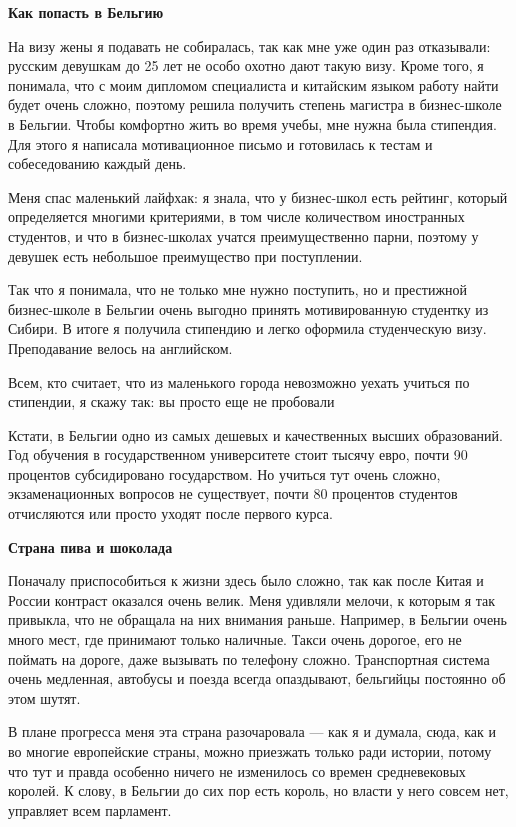 \textbf{Как попасть в Бельгию}

На визу жены я подавать не собиралась, так как мне уже один раз отказывали: русским девушкам до 25 лет не особо охотно дают такую визу. Кроме того, я понимала, что с моим дипломом специалиста и китайским языком работу найти будет очень сложно, поэтому решила получить степень магистра в бизнес-школе в Бельгии. Чтобы комфортно жить во время учебы, мне нужна была стипендия. Для этого я написала мотивационное письмо и готовилась к тестам и собеседованию каждый день.

Меня спас маленький лайфхак: я знала, что у бизнес-школ есть рейтинг, который определяется многими критериями, в том числе количеством иностранных студентов, и что в бизнес-школах учатся преимущественно парни, поэтому у девушек есть небольшое преимущество при поступлении.

Так что я понимала, что не только мне нужно поступить, но и престижной бизнес-школе в Бельгии очень выгодно принять мотивированную студентку из Сибири. В итоге я получила стипендию и легко оформила студенческую визу. Преподавание велось на английском.

\begin{fancyquotes}
    Всем, кто считает, что из маленького города невозможно уехать учиться по стипендии, я скажу так: вы просто еще не пробовали
\end{fancyquotes}

Кстати, в Бельгии одно из самых дешевых и качественных высших образований. Год обучения в государственном университете стоит тысячу евро, почти 90 процентов субсидировано государством. Но учиться тут очень сложно, экзаменационных вопросов не существует, почти 80 процентов студентов отчисляются или просто уходят после первого курса.

\textbf{Страна пива и шоколада}

Поначалу приспособиться к жизни здесь было сложно, так как после Китая и России контраст оказался очень велик. Меня удивляли мелочи, к которым я так привыкла, что не обращала на них внимания раньше. Например, в Бельгии очень много мест, где принимают только наличные. Такси очень дорогое, его не поймать на дороге, даже вызывать по телефону сложно. Транспортная система очень медленная, автобусы и поезда всегда опаздывают, бельгийцы постоянно об этом шутят.

В плане прогресса меня эта страна разочаровала — как я и думала, сюда, как и во многие европейские страны, можно приезжать только ради истории, потому что тут и правда особенно ничего не изменилось со времен средневековых королей. К слову, в Бельгии до сих пор есть король, но власти у него совсем нет, управляет всем парламент.

